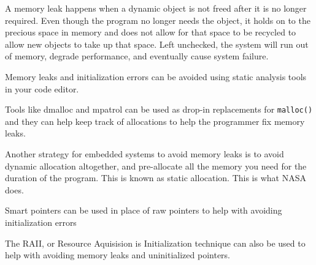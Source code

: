 A memory leak happens when a dynamic object is not freed after it is no longer
required. Even though the program no longer needs the object, it holds on to the
precious space in memory and does not allow for that space to be recycled to
allow new objects to take up that space. Left unchecked, the system will run out
of memory, degrade performance, and eventually cause system failure.

Memory leaks and initialization errors can be avoided using static analysis
tools in your code editor. 

Tools like dmalloc and mpatrol can be used as drop-in
replacements for \texttt{malloc()} and they can help keep track of allocations
to help the programmer fix memory leaks. 

Another strategy for embedded systems to avoid memory leaks is to avoid dynamic
allocation altogether, and pre-allocate all the memory you need for the duration
of the program. This is known as static allocation. This is what NASA does.

Smart pointers can be used in place of raw pointers to help with avoiding
initialization errors

The RAII, or Resource Aquisision is Initialization technique can also be used to
help with avoiding memory leaks and uninitialized pointers.
